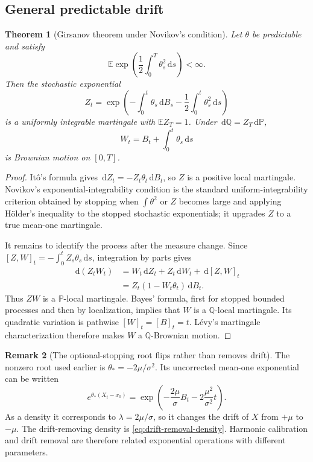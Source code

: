 \documentclass[10pt,a4paper]{article}
\numberwithin{equation}{section}
\theoremstyle{blueplain}
\newtheorem{theorem}{Theorem}[section]
\theoremstyle{definition}
\newtheorem{remark}[theorem]{Remark}
\newcommand{\E}{\mathbb E}
\newcommand{\Pp}{\mathbb P}
\newcommand{\dd}{\,\mathrm d}
\begin{document}
\subsection{General predictable drift}

\begin{theorem}[Girsanov theorem under Novikov's condition]
Let \(\theta\) be predictable and satisfy
\begin{equation}
  \E\exp\!\left(\frac12\int_0^T\theta_s^2\dd s\right)<\infty.
  \label{eq:novikov}
\end{equation}
Then the stochastic exponential
\begin{equation}
  Z_t=\exp\!\left(
   -\int_0^t\theta_s\dd B_s
   -\frac12\int_0^t\theta_s^2\dd s
  \right)
  \label{eq:girsanov-density-general}
\end{equation}
is a uniformly integrable martingale with \(\E Z_T=1\).  Under
\(\dd\mathbb Q=Z_T\dd\Pp\),
\begin{equation}
  W_t=B_t+\int_0^t\theta_s\dd s
  \label{eq:girsanov-general-bm}
\end{equation}
is Brownian motion on \([0,T]\).
\end{theorem}

\begin{proof}
It\^o's formula gives \(\dd Z_t=-Z_t\theta_t\dd B_t\), so \(Z\) is a
positive local martingale.  Novikov's exponential-integrability condition is
the standard uniform-integrability criterion obtained by stopping when
\(\int\theta^2\) or \(Z\) becomes large and applying H\"older's inequality to
the stopped stochastic exponentials; it upgrades \(Z\) to a true mean-one
martingale.

It remains to identify the process after the measure change.  Since
\([Z,W]_t=-\int_0^tZ_s\theta_s\dd s\), integration by parts gives
\begin{align*}
 \dd(Z_tW_t)
 &=W_t\dd Z_t+Z_t\dd W_t+\dd[Z,W]_t\\
 &=Z_t(1-W_t\theta_t)\dd B_t.
\end{align*}
Thus \(ZW\) is a \(\Pp\)-local martingale.  Bayes' formula, first for stopped
bounded processes and then by localization, implies that \(W\) is a
\(\mathbb Q\)-local martingale.  Its quadratic variation is pathwise
\([W]_t=[B]_t=t\).  L\'evy's martingale characterization therefore makes
\(W\) a \(\mathbb Q\)-Brownian motion.
\end{proof}

\begin{remark}[The optional-stopping root flips rather than removes drift]
The nonzero root used earlier is \(\theta_*=-2\mu/\sigma^2\).  Its uncorrected
mean-one exponential can be written
\[
 e^{\theta_*(X_t-x_0)}
 =\exp\!\left(-\frac{2\mu}{\sigma}B_t
              -2\frac{\mu^2}{\sigma^2}t\right).
\]
As a density it corresponds to \(\lambda=2\mu/\sigma\), so it changes the
drift of \(X\) from \(+\mu\) to \(-\mu\).  The drift-removing density is
\eqref{eq:drift-removal-density}.  Harmonic calibration and drift removal are
therefore related exponential operations with different parameters.
\end{remark}
\end{document}
